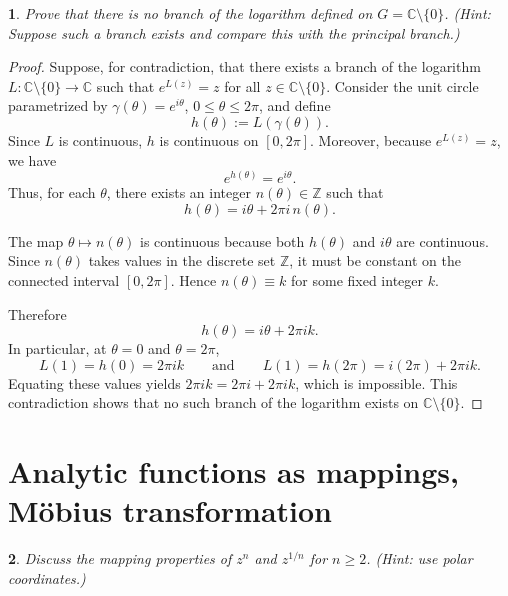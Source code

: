 \documentclass[12pt, a4paper]{report}
\theoremstyle{spaced}
\newtheorem{exercise}{}
\newcommand{\setexercise}[1]{\setcounter{exercise}{#1-1}}
\begin{document}
\setexercise{21}
\begin{exercise}
	Prove that there is no branch of the logarithm defined on \(G=\mathbb{C}\setminus\{0\}\).
	\emph{(Hint: Suppose such a branch exists and compare this with the principal branch.)}
\end{exercise}

\begin{proof}
	Suppose, for contradiction, that there exists a branch of the logarithm
	\(L : \mathbb{C}\setminus\{0\}\to \mathbb{C}\) such that \(e^{L(z)}=z\) for all
	\(z\in\mathbb{C}\setminus\{0\}\).
	Consider the unit circle parametrized by \(\gamma(\theta)=e^{i\theta}\),
	\(0 \le \theta \le 2\pi\), and define
	\[
		h(\theta) := L(\gamma(\theta)).
	\]
	Since \(L\) is continuous, \(h\) is continuous on \([0,2\pi]\).
	Moreover, because \(e^{L(z)}=z\), we have
	\[
		e^{h(\theta)} = e^{i\theta}.
	\]
	Thus, for each \(\theta\), there exists an integer \(n(\theta)\in\mathbb{Z}\)
	such that
	\[
		h(\theta) = i\theta + 2\pi i\, n(\theta).
	\]

	The map \(\theta \mapsto n(\theta)\) is continuous because both \(h(\theta)\)
	and \(i\theta\) are continuous. Since \(n(\theta)\) takes values in the
	discrete set \(\mathbb{Z}\), it must be constant on the connected interval
	\([0,2\pi]\). Hence \(n(\theta) \equiv k\) for some fixed integer \(k\).

	Therefore
	\[
		h(\theta) = i\theta + 2\pi i k.
	\]
	In particular, at \(\theta = 0\) and \(\theta = 2\pi\),
	\[
		L(1) = h(0) = 2\pi i k
		\qquad\text{and}\qquad
		L(1) = h(2\pi) = i(2\pi) + 2\pi i k.
	\]
	Equating these values yields \(2\pi i k = 2\pi i + 2\pi i k\), which is
	impossible. This contradiction shows that no such branch of the logarithm
	exists on \(\mathbb{C}\setminus\{0\}\).
\end{proof}

\section{Analytic functions as mappings, Möbius transformation}

\setexercise{4}
\begin{exercise}
	Discuss the mapping properties of \(z^{n}\) and \(z^{1/n}\) for \(n\ge 2\). \emph{(Hint: use polar coordinates.)}
\end{exercise}
\end{document}
